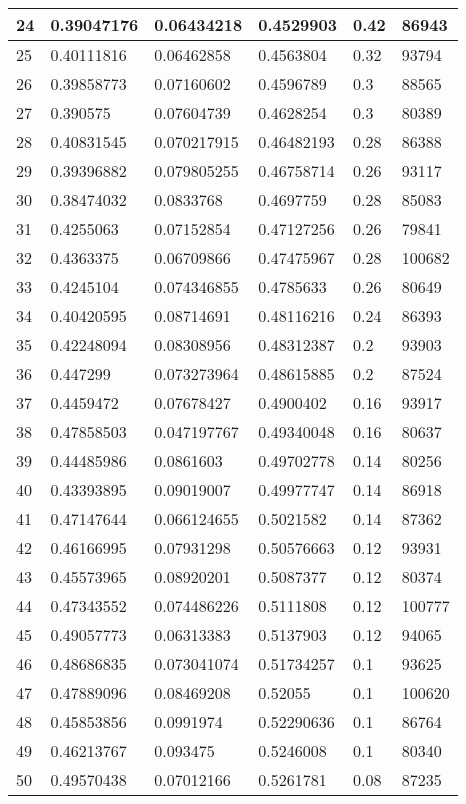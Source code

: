 \begin{longtable}{|l|l|l|l|l|l|}
24 & 0.39047176 & 0.06434218 & 0.4529903 & 0.42 & 86943 \\ \hline 
25 & 0.40111816 & 0.06462858 & 0.4563804 & 0.32 & 93794 \\ \hline 
26 & 0.39858773 & 0.07160602 & 0.4596789 & 0.3 & 88565 \\ \hline 
27 & 0.390575 & 0.07604739 & 0.4628254 & 0.3 & 80389 \\ \hline 
28 & 0.40831545 & 0.070217915 & 0.46482193 & 0.28 & 86388 \\ \hline 
29 & 0.39396882 & 0.079805255 & 0.46758714 & 0.26 & 93117 \\ \hline 
30 & 0.38474032 & 0.0833768 & 0.4697759 & 0.28 & 85083 \\ \hline 
31 & 0.4255063 & 0.07152854 & 0.47127256 & 0.26 & 79841 \\ \hline 
32 & 0.4363375 & 0.06709866 & 0.47475967 & 0.28 & 100682 \\ \hline 
33 & 0.4245104 & 0.074346855 & 0.4785633 & 0.26 & 80649 \\ \hline 
34 & 0.40420595 & 0.08714691 & 0.48116216 & 0.24 & 86393 \\ \hline 
35 & 0.42248094 & 0.08308956 & 0.48312387 & 0.2 & 93903 \\ \hline 
36 & 0.447299 & 0.073273964 & 0.48615885 & 0.2 & 87524 \\ \hline 
37 & 0.4459472 & 0.07678427 & 0.4900402 & 0.16 & 93917 \\ \hline 
38 & 0.47858503 & 0.047197767 & 0.49340048 & 0.16 & 80637 \\ \hline 
39 & 0.44485986 & 0.0861603 & 0.49702778 & 0.14 & 80256 \\ \hline 
40 & 0.43393895 & 0.09019007 & 0.49977747 & 0.14 & 86918 \\ \hline 
41 & 0.47147644 & 0.066124655 & 0.5021582 & 0.14 & 87362 \\ \hline 
42 & 0.46166995 & 0.07931298 & 0.50576663 & 0.12 & 93931 \\ \hline 
43 & 0.45573965 & 0.08920201 & 0.5087377 & 0.12 & 80374 \\ \hline 
44 & 0.47343552 & 0.074486226 & 0.5111808 & 0.12 & 100777 \\ \hline 
45 & 0.49057773 & 0.06313383 & 0.5137903 & 0.12 & 94065 \\ \hline 
46 & 0.48686835 & 0.073041074 & 0.51734257 & 0.1 & 93625 \\ \hline 
47 & 0.47889096 & 0.08469208 & 0.52055 & 0.1 & 100620 \\ \hline 
48 & 0.45853856 & 0.0991974 & 0.52290636 & 0.1 & 86764 \\ \hline 
49 & 0.46213767 & 0.093475 & 0.5246008 & 0.1 & 80340 \\ \hline 
50 & 0.49570438 & 0.07012166 & 0.5261781 & 0.08 & 87235 \\ \hline 
\end{longtable}